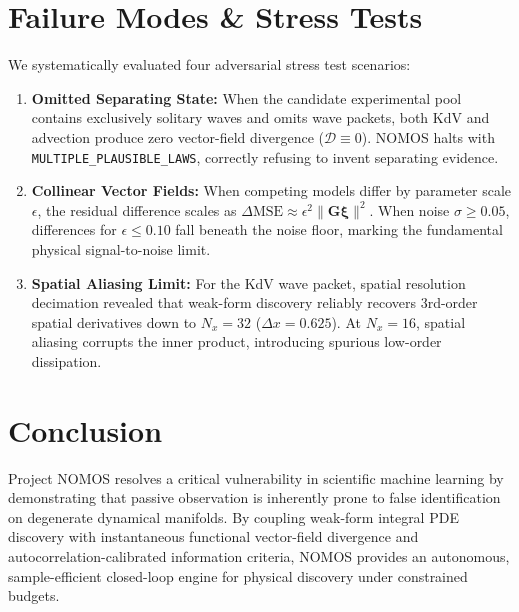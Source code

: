 \documentclass[twocolumn,10pt,a4paper]{article}
\begin{document}
\section{Failure Modes \& Stress Tests}
We systematically evaluated four adversarial stress test scenarios:
\begin{enumerate}
    \item \textbf{Omitted Separating State:} When the candidate experimental pool contains exclusively solitary waves and omits wave packets, both KdV and advection produce zero vector-field divergence ($\mathcal{D} \equiv 0$). NOMOS halts with \texttt{MULTIPLE\_PLAUSIBLE\_LAWS}, correctly refusing to invent separating evidence.
    \item \textbf{Collinear Vector Fields:} When competing models differ by parameter scale $\epsilon$, the residual difference scales as $\Delta\text{MSE} \approx \epsilon^2 \| \mathbf{G} \boldsymbol{\xi} \|^2$. When noise $\sigma \ge 0.05$, differences for $\epsilon \le 0.10$ fall beneath the noise floor, marking the fundamental physical signal-to-noise limit.
    \item \textbf{Spatial Aliasing Limit:} For the KdV wave packet, spatial resolution decimation revealed that weak-form discovery reliably recovers 3rd-order spatial derivatives down to $N_x = 32$ ($\Delta x = 0.625$). At $N_x = 16$, spatial aliasing corrupts the inner product, introducing spurious low-order dissipation.
\end{enumerate}

\section{Conclusion}
Project NOMOS resolves a critical vulnerability in scientific machine learning by demonstrating that passive observation is inherently prone to false identification on degenerate dynamical manifolds. By coupling weak-form integral PDE discovery with instantaneous functional vector-field divergence and autocorrelation-calibrated information criteria, NOMOS provides an autonomous, sample-efficient closed-loop engine for physical discovery under constrained budgets.



\end{document}
